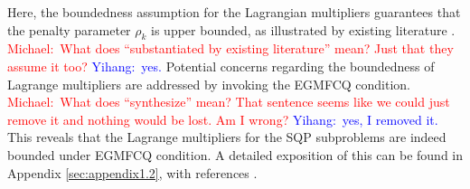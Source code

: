 \documentclass[aos]{imsart}
\numberwithin{equation}{section}
\theoremstyle{plain}
\newcommand{\michael}[1]{\textcolor{red}{Michael:\ #1}}
\newcommand{\yihang}[1]{\textcolor{blue}{Yihang:\ #1}}
\begin{document}
Here, the boundedness assumption for the Lagrangian multipliers guarantees that the penalty parameter $\rho_k$ is upper bounded, as illustrated by existing literature \cite{burke1989robust, bertsekas1997nonlinear}. 
\michael{What does ``substantiated by existing literature'' mean? Just that they assume it too?} \yihang{yes.}
Potential concerns regarding the boundedness of Lagrange multipliers are addressed by invoking the EGMFCQ condition.  
\michael{What does ``synthesize'' mean?  That sentence seems like we could just remove it and nothing would be lost. Am I wrong?}
\yihang{yes, I removed it.}
This reveals that the Lagrange multipliers for the SQP subproblems are indeed bounded under EGMFCQ condition.
A detailed exposition of this can be found in Appendix \ref{sec:appendix1.2}, with references \cite{burke1989robust, gauvin1977necessary}.
\end{document}
